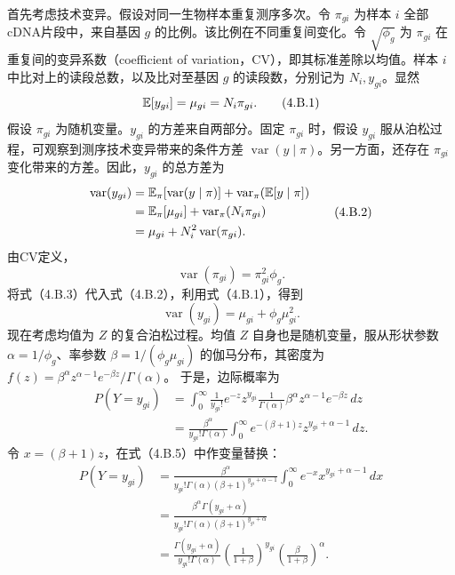 首先考虑技术变异。假设对同一生物样本重复测序多次。令 $\pi_{gi}$ 为样本 $i$ 全部cDNA片段中，来自基因 $g$ 的比例。该比例在不同重复间变化。令 $\sqrt{\phi_g}$ 为 $\pi_{gi}$ 在重复间的变异系数（coefficient of variation，CV），即其标准差除以均值。样本 $i$ 中比对上的读段总数，以及比对至基因 $g$ 的读段数，分别记为 $N_i,y_{gi}$。显然
\begin{equation}
\mathbb{E}[y_{gi}]=\mu_{gi}=N_i\pi_{gi}.\tag{4.B.1}
\end{equation}
假设 $\pi_{gi}$ 为随机变量。$y_{gi}$ 的方差来自两部分。固定 $\pi_{gi}$ 时，假设 $y_{gi}$ 服从泊松过程，可观察到测序技术变异带来的条件方差 $\operatorname{var}(y\mid\pi)$。另一方面，还存在 $\pi_{gi}$ 变化带来的方差。因此，$y_{gi}$ 的总方差为
\begin{equation}
\begin{aligned}
\operatorname{var}(y_{gi})
&=\mathbb{E}_\pi[\operatorname{var}(y\mid\pi)]+\operatorname{var}_\pi(\mathbb{E}[y\mid\pi])\\
&=\mathbb{E}_\pi[\mu_{gi}]+\operatorname{var}_\pi(N_i\pi_{gi})\\
&=\mu_{gi}+N_i^2\operatorname{var}(\pi_{gi}).
\end{aligned}\tag{4.B.2}
\end{equation}
由CV定义，
\begin{equation}
\operatorname{var}(\pi_{gi})=\pi_{gi}^2\phi_g.\tag{4.B.3}
\end{equation}
将式（4.B.3）代入式（4.B.2），利用式（4.B.1），得到
\begin{equation}
\operatorname{var}(y_{gi})=\mu_{gi}+\phi_g\mu_{gi}^2.\tag{4.B.4}
\end{equation}
现在考虑均值为 $Z$ 的复合泊松过程。均值 $Z$ 自身也是随机变量，服从形状参数 $\alpha=1/\phi_g$、率参数 $\beta=1/(\phi_g\mu_{gi})$ 的伽马分布，其密度为
$f(z)=\beta^\alpha z^{\alpha-1}e^{-\beta z}/\Gamma(\alpha)$。
于是，边际概率为
\begin{equation}
\begin{aligned}
P(Y=y_{gi})
&=\int_0^\infty\frac1{y_{gi}!}e^{-z}z^{y_{gi}}
 \frac1{\Gamma(\alpha)}\beta^\alpha z^{\alpha-1}e^{-\beta z}\,dz\\
&=\frac{\beta^\alpha}{y_{gi}!\Gamma(\alpha)}
 \int_0^\infty e^{-(\beta+1)z}z^{y_{gi}+\alpha-1}\,dz.
\end{aligned}\tag{4.B.5}
\end{equation}
令 $x=(\beta+1)z$，在式（4.B.5）中作变量替换：
\begin{equation}
\begin{aligned}
P(Y=y_{gi})
&=\frac{\beta^\alpha}{y_{gi}!\Gamma(\alpha)(\beta+1)^{y_{gi}+\alpha-1}}
 \int_0^\infty e^{-x}x^{y_{gi}+\alpha-1}\,dx\\
&=\frac{\beta^\alpha\Gamma(y_{gi}+\alpha)}{
 y_{gi}!\Gamma(\alpha)(\beta+1)^{y_{gi}+\alpha}}\\
&=\frac{\Gamma(y_{gi}+\alpha)}{y_{gi}!\Gamma(\alpha)}
 \left(\frac1{1+\beta}\right)^{y_{gi}}
 \left(\frac\beta{1+\beta}\right)^\alpha.
\end{aligned}\tag{4.B.6}
\end{equation}
